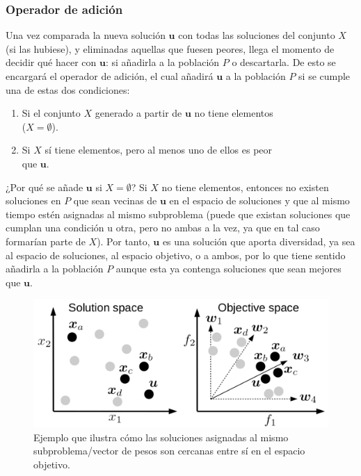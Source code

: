 \subsubsection{Operador de adición}

Una vez comparada la nueva solución $\textbf{u}$ con todas las soluciones del conjunto $X$ (si las hubiese), y eliminadas aquellas que fuesen peores, llega el momento de decidir qué hacer con $\textbf{u}$: si añadirla a la población $P$ o descartarla. De esto se encargará el operador de adición, el cual añadirá $\textbf{u}$ a la población $P$ si se cumple una de estas dos condiciones:
\begin{enumerate}
	\item Si el conjunto $X$ generado a partir de $\textbf{u}$ no tiene elementos\\($X = \emptyset$).
	\item Si $X$ sí tiene elementos, pero al menos uno de ellos es peor\\que $\textbf{u}$.
\end{enumerate}

¿Por qué se añade $\textbf{u}$ si $X = \emptyset$? Si $X$ no tiene elementos, entonces no existen soluciones en $P$ que sean vecinas de $\textbf{u}$ en el espacio de soluciones y que al mismo tiempo estén asignadas al mismo subproblema (puede que existan soluciones que cumplan una condición u otra, pero no ambas a la vez, ya que en tal caso formarían parte de $X$). Por tanto, $\textbf{u}$ es una solución que aporta diversidad, ya sea al espacio de soluciones, al espacio objetivo, o a ambos, por lo que tiene sentido añadirla a la población $P$ aunque esta ya contenga soluciones que sean mejores que $\textbf{u}$.

\begin{figure}[h]
	\centering
	\includegraphics[width=1.0\textwidth]{Images/same_subproblem}
	\caption[Ejemplo que ilustra cómo las soluciones asignadas al mismo subproblema/vector de pesos son cercanas entre sí en el espacio objetivo.]{Ejemplo que ilustra cómo las soluciones asignadas al mismo subproblema/vector de pesos son cercanas entre sí en el espacio objetivo. \cite{tanabe2019framework}}
	\label{fig:assigsubproblem}
\end{figure}


